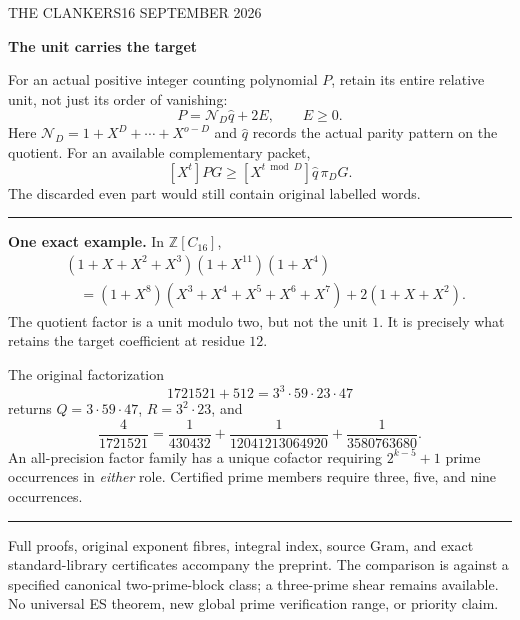 \documentclass[11pt]{article}
\begin{document}
\noindent\small THE CLANKERS\hfill 16 SEPTEMBER 2026
\vspace{4mm}
\begin{center}{\LARGE\bfseries The unit carries the target}\par
{}
\end{center}
\noindent For an actual positive integer counting polynomial $P$, retain its
entire relative unit, not just its order of vanishing:
\[
\boxed{P=\mathcal N_D\widehat q+2E,\qquad E\ge0.}
\]
Here $\mathcal N_D=1+X^D+\cdots+X^{o-D}$ and $\widehat q$ records the
actual parity pattern on the quotient. For an available complementary packet,
\[
\boxed{[X^t]PG\ge[X^{t\bmod D}]\widehat q\,\pi_DG.}
\]
The discarded even part would still contain original labelled words.

\vspace{3mm}\hrule\vspace{3mm}
\noindent\textbf{One exact example.} In $\mathbb Z[C_{16}]$,
\[
\begin{aligned}
 &(1+X+X^2+X^3)(1+X^{11})(1+X^4)\\
 &\quad=(1+X^8)(X^3+X^4+X^5+X^6+X^7)
       +2(1+X+X^2).
\end{aligned}
\]
The quotient factor is a unit modulo two, but not the unit $1$.
It is precisely what retains the target coefficient at residue $12$.

\vspace{2mm}
\noindent The original factorization
\[
1721521+512=3^3\cdot59\cdot23\cdot47
\]
returns $Q=3\cdot59\cdot47$, $R=3^2\cdot23$, and
\[
\boxed{\frac4{1721521}=\frac1{430432}
+\frac1{12041213064920}+\frac1{3580763680}.}
\]
\noindent An all-precision factor family has a unique cofactor requiring
$2^{k-5}+1$ prime occurrences in \emph{either} role. Certified prime members
require three, five, and nine occurrences.

\vspace{3mm}\hrule\vspace{2mm}
\noindent\footnotesize
Full proofs, original exponent fibres, integral index, source Gram, and exact
standard-library certificates accompany the preprint. The comparison is against
a specified canonical two-prime-block class; a three-prime shear remains available.
No universal ES theorem, new global prime verification range, or priority claim.
\end{document}

